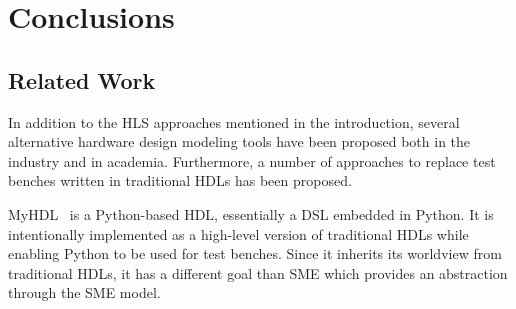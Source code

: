 \chapter{Conclusions}





\section{Related Work}
\label{sec:retwork}


In addition to the HLS approaches mentioned in the introduction, several
alternative hardware design modeling tools have been proposed both in the
industry and in academia. Furthermore, a number of approaches to replace test
benches written in traditional HDLs has been proposed.

MyHDL~\cite{myhdl} is a Python-based HDL, essentially a DSL embedded in
Python. It is intentionally implemented as a high-level version of traditional
HDLs while enabling Python to be used for test benches. Since it inherits its
worldview from traditional HDLs, it has a different goal than SME which provides
an abstraction through the SME model.

